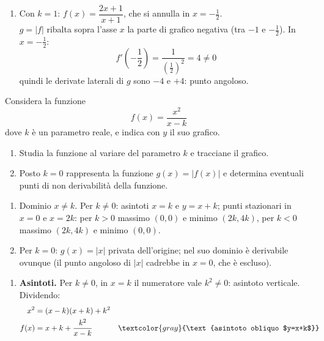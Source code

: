 \begin{question}[ID=3.1, subtitle={Studio di $f(x)=(2x+1)/(x+k)$ con parametro $k$}, tags={studio di funzione, parametrico}, difficulty=difficile]
\begin{explanation}
\begin{enumerate}
    \item Con $k=1$: $f(x)=\dfrac{2x+1}{x+1}$, che si annulla in $x=-\tfrac12$. \\
    $g=|f|$ ribalta sopra l'asse $x$ la parte di grafico negativa (tra $-1$ e $-\tfrac12$). In $x=-\tfrac12$:
    \[ f'\left(-\dfrac12\right)=\dfrac{1}{\left(\frac12\right)^2}=4\neq0 \]
    quindi le derivate laterali di $g$ sono $-4$ e $+4$: punto angoloso.
\end{enumerate}
\end{explanation}
\end{question}


\begin{question}[ID=3.2, subtitle={Studio di $f(x)=x^2/(x-k)$ con parametro $k$}, tags={studio di funzione, parametrico}, difficulty=difficile]
Considera la funzione
\begin{equation*}
    f(x) = \frac{x^2}{x-k}
\end{equation*}
dove $k$ è un parametro reale, e indica con $y$ il suo grafico.
\begin{enumerate}
    \item Studia la funzione al variare del parametro $k$ e tracciane il grafico.
    \item Posto $k=0$ rappresenta la funzione $g(x) = |f(x)|$ e determina eventuali punti di non derivabilità della funzione.
\end{enumerate}
\begin{solution}
\begin{enumerate}
    \item Dominio $x\neq k$. Per $k\neq0$: asintoti $x=k$ e $y=x+k$; punti stazionari in $x=0$ e $x=2k$: per $k>0$ massimo $(0,0)$ e minimo $(2k,4k)$, per $k<0$ massimo $(2k,4k)$ e minimo $(0,0)$.
    \item Per $k=0$: $g(x)=|x|$ privata dell'origine; nel suo dominio è derivabile ovunque (il punto angoloso di $|x|$ cadrebbe in $x=0$, che è escluso).
\end{enumerate}
\end{solution}
\begin{explanation}
\begin{enumerate}
    \item \textbf{Asintoti.} Per $k\neq0$, in $x=k$ il numeratore vale $k^2\neq0$: asintoto verticale. Dividendo:
    \[\begin{aligned}
    x^2 &= (x-k)(x+k)+k^2\\
    f(x) &= x+k+\dfrac{k^2}{x-k} && \textcolor{gray}{\text{asintoto obliquo $y=x+k$}}

\end{aligned}\]
\end{enumerate}
\end{explanation}
\end{question}
